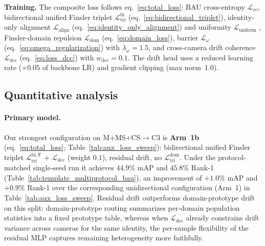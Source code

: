\textbf{Training.}
The composite loss follows eq.~\eqref{eq:total_loss}: BAU cross-entropy $\mathcal{L}_{\mathrm{ce}}$, bidirectional unified Finsler triplet $\mathcal{L}_{\mathrm{tri}}^{\mathrm{bi}}$ (eq.~\ref{eq:bidirectional_triplet}), identity-only alignment $\mathcal{L}_{\mathrm{align}}$ (eq.~\ref{eq:identity_only_alignment}) and uniformity $\mathcal{L}_{\mathrm{uniform}}$ \cite{cho2024generalizable}, Finsler-domain repulsion $\mathcal{L}_{\mathrm{dom}}$ (eq.~\ref{eq:domain_loss}), barrier $\mathcal{L}_\omega$ (eq.~\ref{eq:omega_regularization}) with $\lambda_\omega{=}1.5$, and cross-camera drift coherence $\mathcal{L}_{\mathrm{dcc}}$ (eq.~\ref{eq:loss_dcc}) with $w_{\mathrm{dcc}}{=}0.1$. The drift head uses a reduced learning rate ($\times 0.05$ of backbone LR) and gradient clipping (max norm~1.0). 

\subsection{Quantitative analysis} \label{subsec:quantitative_analysis}
\paragraph{Primary model.}
Our strongest configuration on M+MS+CS$\rightarrow$C3 is \textbf{Arm~1b} (eq.~\ref{eq:total_loss}; Table~\ref{tab:aux_loss_sweep}): bidirectional unified Finsler triplet $\mathcal{L}_{\mathrm{tri}}^{\mathrm{bi, F}}$ + $\mathcal{L}_{\mathrm{dcc}}$ (weight $0.1$), residual drift, no $\mathcal{L}_{\mathrm{tri}}^{\mathrm{dom}}$. Under the protocol-matched single-seed run it achieves $44.9\%$ mAP and $45.8\%$ Rank-1 (Table~\ref{tab:template_multiprotocol_bau}), an improvement of $+1.0\%$ mAP and $+0.9\%$ Rank-1 over the corresponding unidirectional configuration (Arm~1) in Table~\ref{tab:aux_loss_sweep}. Residual drift outperforms domain-prototype drift on this split: domain-prototype routing summarizes per-domain population statistics into a fixed prototype table, whereas when $\mathcal{L}_{\mathrm{dcc}}$ already constrains drift variance across cameras for the same identity, the per-sample flexibility of the residual MLP captures remaining heterogeneity more faithfully.

